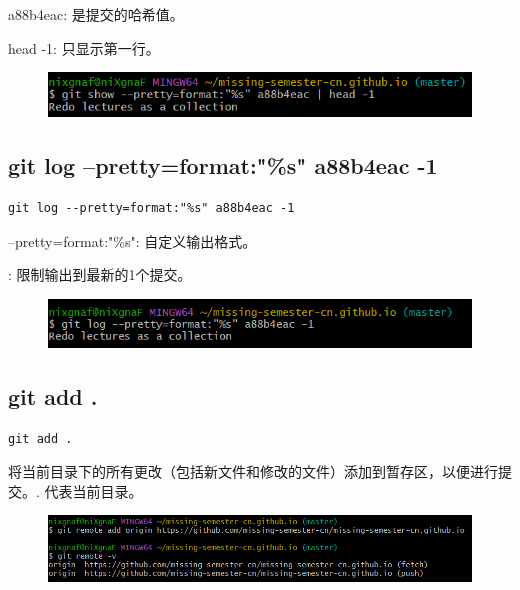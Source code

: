 \documentclass{article}
\begin{document}
\noindent a88b4eac: 是提交的哈希值。

\noindent head -1: 只显示第一行。
\begin{figure}[h]
    \centering
    \includegraphics[width=1\linewidth]{picture/gitlogpretty.png}
\end{figure}

\subsection{git log --pretty=format:"\%s" a88b4eac -1}
\lstset{language=bash}
\begin{lstlisting}
git log --pretty=format:"%s" a88b4eac -1
\end{lstlisting}

\noindent --pretty=format:"\%s": 自定义输出格式。%

: 限制输出到最新的1个提交。
\begin{figure}[h]
    \centering
    \includegraphics[width=1\linewidth]{picture/gitshowpretty.png}
\end{figure}

\subsection{git add .}
\lstset{language=bash}
\begin{lstlisting}
git add .
\end{lstlisting}

\noindent 将当前目录下的所有更改（包括新文件和修改的文件）添加到暂存区，以便进行提交。. 代表当前目录。

\begin{figure}[h]
    \centering
    \includegraphics[width=1\linewidth]{picture/remoteaddd.png}
\end{figure}
\end{document}
